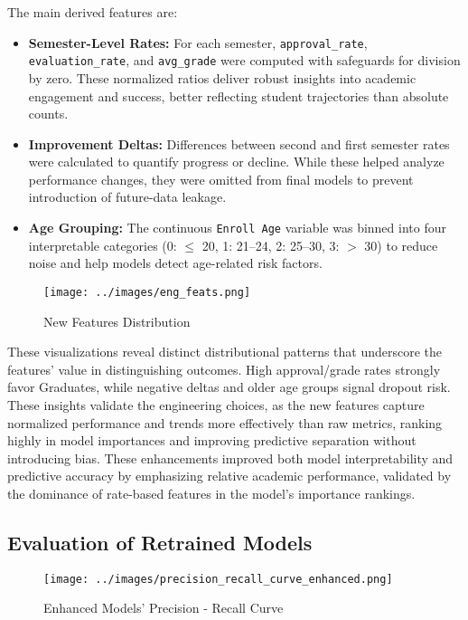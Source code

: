 \documentclass[twoside,final]{hcmut-report}
\begin{document}
The main derived features are:
\begin{itemize}
  \item \textbf{Semester-Level Rates:} For each semester, \texttt{approval\_rate}, \texttt{evaluation\_rate}, and \texttt{avg\_grade} were computed with safeguards for division by zero. These normalized ratios deliver robust insights into academic engagement and success, better reflecting student trajectories than absolute counts.
  \item \textbf{Improvement Deltas:} Differences between second and first semester rates were calculated to quantify progress or decline. While these helped analyze performance changes, they were omitted from final models to prevent introduction of future-data leakage.
  \item \textbf{Age Grouping:} The continuous \texttt{Enroll Age} variable was binned into four interpretable categories (0: $\leq$ 20, 1: 21--24, 2: 25--30, 3: $>$ 30) to reduce noise and help models detect age-related risk factors.
\end{itemize}
\begin{figure}[H]
  \centering
  \texttt{[image: ../images/eng\_feats.png]}
  \caption{New Features Distribution}
  \label{eng_feats}
\end{figure}

These visualizations reveal distinct distributional patterns that underscore the features' value in distinguishing outcomes. High approval/grade rates strongly favor Graduates, while negative deltas and older age groups signal dropout risk. These insights validate the engineering choices, as the new features capture normalized performance and trends more effectively than raw metrics, ranking highly in model importances and improving predictive separation without introducing bias. These enhancements improved both model interpretability and predictive accuracy by emphasizing relative academic performance, validated by the dominance of rate-based features in the model's importance rankings.
\subsection{Evaluation of Retrained Models}
\begin{figure}[H]
  \centering
  \texttt{[image: ../images/precision\_recall\_curve\_enhanced.png]}
  \caption{Enhanced Models' Precision - Recall Curve}
  \label{pr_curve_enhanced}
\end{figure}
\end{document}
